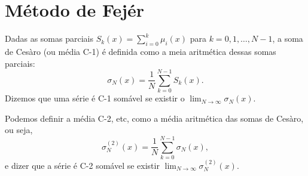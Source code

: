 \section{Método de Fejér}
\begin{defi}
  Dadas as somas parciais $S_k(x) = \sum_{i = 0}^k \mu_i(x)$ para $k = 0, 1,
  \ldots, N - 1$, a soma de Cesàro (ou média C-1) é definida como a meia
  aritmética dessas somas parciais:
  \begin{dmath*}
    \sigma_N(x) = \frac{1}{N} \sum_{k = 0}^{N - 1} S_k(x).
  \end{dmath*}
  Dizemos que uma série é C-1 somável se existir o $\lim_{N \to \infty}
  \sigma_N(x)$.
\end{defi}
\begin{obs}
  Podemos definir a média C-2, etc, como a média aritmética das somas de
  Cesàro, ou seja,
  \begin{dmath*}
    \sigma_N^{(2)}(x) = \frac{1}{N} \sum_{k = 0}^{N - 1} \sigma_N(x),
  \end{dmath*}
  e dizer que a série é C-2 somável se existir $\lim_{N \to \infty}
  \sigma_N^{(2)}(x)$.
\end{obs}
